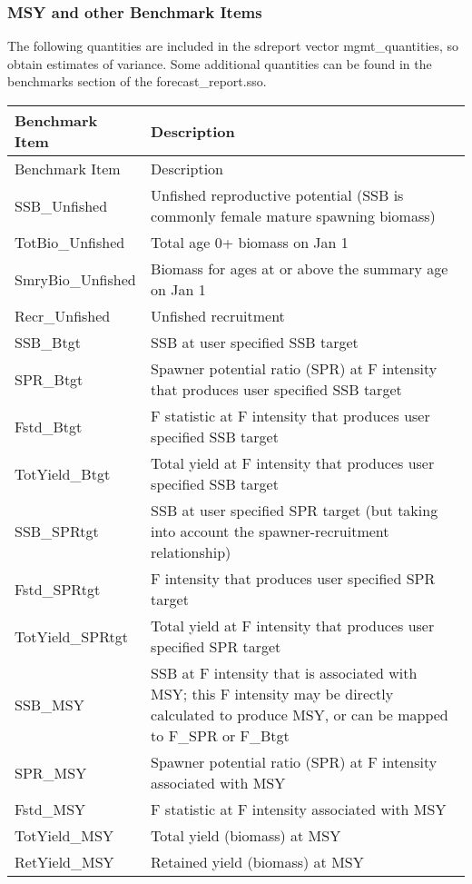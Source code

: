 \subsubsection{MSY and other Benchmark Items}
The following quantities are included in the sdreport vector mgmt\_quantities, so obtain estimates of variance.  Some additional quantities can be found in the benchmarks section of the forecast\_report.sso.

\begin{center}
	\begin{longtable}{p{4cm} p{11cm}}
		Benchmark Item &  Description\\
		\hline
		\endfirsthead


		Benchmark Item &  Description\\
		\hline
		\endhead
		
		\endfoot
		\hline		
		\endlastfoot
		
		SSB\_Unfished & Unfished reproductive potential (SSB is commonly female mature spawning biomass)\\
		TotBio\_Unfished & Total age 0+ biomass on Jan 1\\
		SmryBio\_Unfished & Biomass for ages at or above the summary age on Jan 1\\
		Recr\_Unfished & Unfished recruitment\\
		SSB\_Btgt & SSB at user specified SSB target\\
		SPR\_Btgt & Spawner potential ratio (SPR) at F intensity that produces user specified SSB target\\
		Fstd\_Btgt & F statistic at F intensity that produces user specified SSB target\\
		TotYield\_Btgt & Total yield at F intensity that produces user specified SSB target\\
		SSB\_SPRtgt & SSB at user specified SPR target (but taking into account the spawner-recruitment relationship)\\
		Fstd\_SPRtgt & F intensity that produces user specified SPR target\\
		TotYield\_SPRtgt & Total yield at F intensity that produces user specified SPR target\\
		SSB\_MSY & SSB at F intensity that is associated with MSY; this F intensity may be directly calculated to produce MSY, or can be mapped to F\_SPR or F\_Btgt\\
		SPR\_MSY & Spawner potential ratio (SPR) at F intensity associated with MSY\\
		Fstd\_MSY & F statistic at F intensity associated with MSY\\
		TotYield\_MSY & Total yield (biomass) at MSY \\
		RetYield\_MSY & Retained yield (biomass) at MSY 
	\end{longtable}
\end{center}

